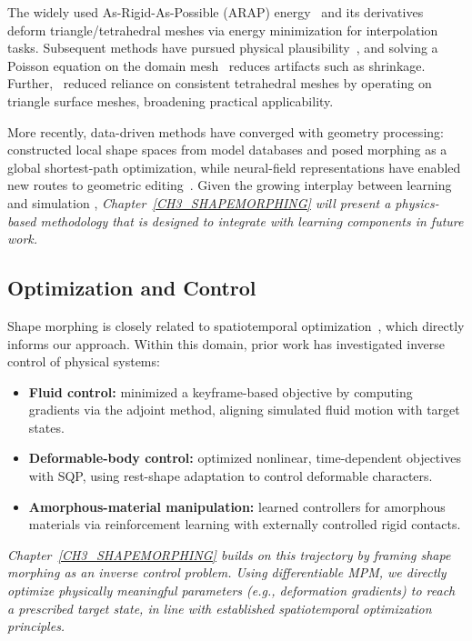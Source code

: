     The widely used As-Rigid-As-Possible (ARAP) energy~\citep{2000-ARAPShapeInterpolation} and its derivatives deform triangle/tetrahedral meshes via energy minimization for interpolation tasks. Subsequent methods have pursued physical plausibility~\citep{2004-ActualMorphing, 2020-HamiltonianShapeInterpolation}, and solving a Poisson equation on the domain mesh~\citep{2005-PoissonShapeInterpolation} reduces artifacts such as shrinkage. Further,~\citet{liu2011rigid} reduced reliance on consistent tetrahedral meshes by operating on triangle surface meshes, broadening practical applicability.
    
    More recently, data-driven methods have converged with geometry processing: \citet{2013-DataDrivenShapeMorphing} constructed local shape spaces from model databases and posed morphing as a global shortest-path optimization, while neural-field representations have enabled new routes to geometric editing~\citep{yang2021geometry}. Given the growing interplay between learning and simulation \citep[see, e.g.,][]{sharpdeep}, \emph{Chapter~\ref{CH3_SHAPEMORPHING} will present a physics-based methodology that is designed to integrate with learning components in future work.}

\subsection{Optimization and Control}
Shape morphing is closely related to spatiotemporal optimization~\citep{1988-SpacetimeConstraints}, which directly informs our approach. Within this domain, prior work has investigated inverse control of physical systems:
\begin{itemize}
  \item \textbf{Fluid control:} \citet{2004-FluidControlAdjointMethod} minimized a keyframe-based objective by computing gradients via the adjoint method, aligning simulated fluid motion with target states.
  \item \textbf{Deformable-body control:} \citet{2012-DeformableObjectsAlive} optimized nonlinear, time-dependent objectives with SQP, using rest-shape adaptation to control deformable characters.
  \item \textbf{Amorphous-material manipulation:} \citet{2020-ManipulateAmorphousMaterialsRL} learned controllers for amorphous materials via reinforcement learning with externally controlled rigid contacts.
\end{itemize}
\emph{Chapter~\ref{CH3_SHAPEMORPHING} builds on this trajectory by framing shape morphing as an inverse control problem. Using differentiable MPM, we directly optimize physically meaningful parameters (e.g., deformation gradients) to reach a prescribed target state, in line with established spatiotemporal optimization principles.}

